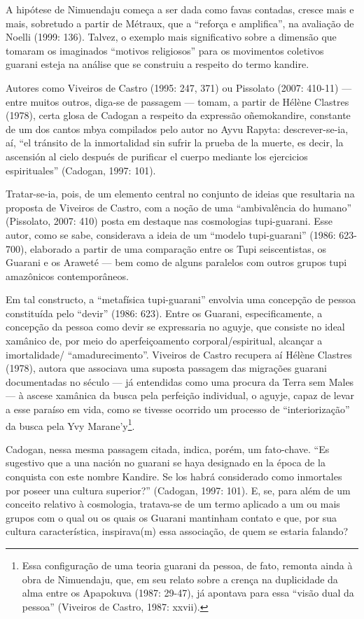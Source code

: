 A hipótese de Nimuendaju começa a ser dada como favas contadas, cresce
mais e mais, sobretudo a partir de Métraux, que a ``reforça e
amplifica'', na avaliação de Noelli  (1999: 136). Talvez, o exemplo mais
significativo sobre a dimensão que tomaram os imaginados ``motivos
religiosos'' para os movimentos coletivos guarani esteja na análise que
se construiu a respeito do termo kandire.

Autores como Viveiros de Castro (1995: 247, 371) ou Pissolato (2007:
410-11) — entre muitos outros, diga-se de passagem — tomam, a partir de
Hélène Clastres (1978), certa glosa de Cadogan a respeito da expressão
oñemokandire, constante de um dos cantos mbya compilados pelo autor no
Ayvu Rapyta: descrever-se-ia, aí, ``el tránsito de la inmortalidad sin
sufrir la prueba de la muerte, es decir, la ascensión al cielo después
de purificar el cuerpo mediante los ejercicios espirituales'' (Cadogan,
1997: 101). 

Tratar-se-ia, pois, de um elemento central no conjunto de ideias que
resultaria na proposta de Viveiros de Castro, com a noção de uma
``ambivalência do humano'' (Pissolato, 2007: 410) posta em destaque nas
cosmologias tupi-guarani. Esse autor, como se sabe, considerava a ideia
de um ``modelo tupi-guarani'' (1986: 623-700), elaborado a partir de uma
comparação entre os Tupi seiscentistas, os Guarani e os Araweté — bem
como de alguns paralelos com outros grupos tupi amazônicos
contemporâneos.

Em tal constructo, a ``metafísica tupi-guarani'' envolvia uma concepção de
pessoa constituída pelo ``devir'' (1986: 623). Entre os Guarani,
especificamente, a concepção da pessoa como devir se expressaria no
aguyje, que consiste no ideal xamânico de, por meio do aperfeiçoamento
corporal/espiritual, alcançar a imortalidade/ ``amadurecimento''.
Viveiros de Castro recupera aí Hélène Clastres (1978), autora que
associava uma suposta passagem das migrações guarani documentadas no
século  — já entendidas como uma procura da Terra sem Males — à
ascese xamânica da busca pela perfeição individual, o aguyje, capaz de
levar a esse paraíso em vida, como se tivesse ocorrido um processo de
``interiorização'' da busca pela Yvy Marane’y\footnote{Essa configuração
de uma teoria guarani da pessoa, de fato, remonta ainda à obra de
Nimuendaju, que, em seu relato sobre a crença na duplicidade da alma
entre os Apapokuva (1987: 29-47), já apontava para essa ``visão dual da
pessoa'' (Viveiros de Castro, 1987: xxvii).}.

Cadogan, nessa mesma passagem citada, indica, porém, um fato-chave. ``Es
sugestivo que a una nación no guarani se haya designado en la época de
la conquista con este nombre Kandire. Se los habrá considerado como
inmortales por poseer una cultura superior?'' (Cadogan, 1997: 101). E,
se, para além de um conceito relativo à cosmologia, tratava-se de um
termo aplicado a um ou mais grupos com o qual ou os quais os Guarani
mantinham contato e que, por sua cultura característica, inspirava(m)
essa associação, de quem se estaria falando?

